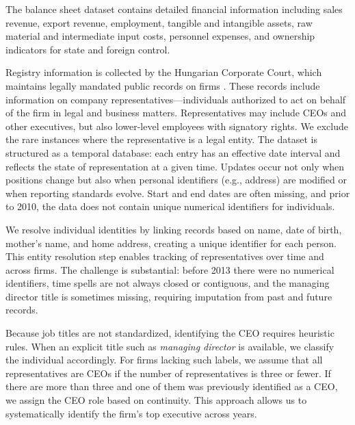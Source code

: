 \documentclass[11pt,a4paper]{article}
\begin{document}
The balance sheet dataset contains detailed financial information including sales revenue, export revenue, employment, tangible and intangible assets, raw material and intermediate input costs, personnel expenses, and ownership indicators for state and foreign control.

Registry information is collected by the Hungarian Corporate Court, which maintains legally mandated public records on firms \citep{cegtv}. These records include information on company representatives---individuals authorized to act on behalf of the firm in legal and business matters. Representatives may include CEOs and other executives, but also lower-level employees with signatory rights. We exclude the rare instances where the representative is a legal entity. The dataset is structured as a temporal database: each entry has an effective date interval and reflects the state of representation at a given time. Updates occur not only when positions change but also when personal identifiers (e.g., address) are modified or when reporting standards evolve. Start and end dates are often missing, and prior to 2010, the data does not contain unique numerical identifiers for individuals.

We resolve individual identities by linking records based on name, date of birth, mother's name, and home address, creating a unique identifier for each person. This entity resolution step enables tracking of representatives over time and across firms. The challenge is substantial: before 2013 there were no numerical identifiers, time spells are not always closed or contiguous, and the managing director title is sometimes missing, requiring imputation from past and future records. %

Because job titles are not standardized, identifying the CEO requires heuristic rules. When an explicit title such as \emph{managing director} is available, we classify the individual accordingly. For firms lacking such labels, we assume that all representatives are CEOs if the number of representatives is three or fewer. If there are more than three and one of them was previously identified as a CEO, we assign the CEO role based on continuity. This approach allows us to systematically identify the firm's top executive across years.
\end{document}

